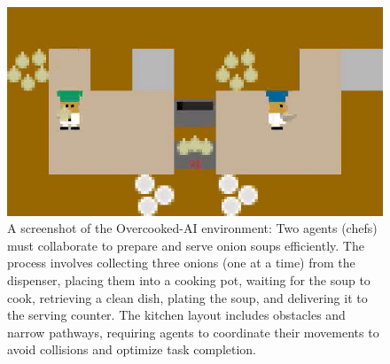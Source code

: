 \documentclass[pdflatex,sn-mathphys-num]{sn-jnl}%
\theoremstyle{thmstyleone}%
\theoremstyle{thmstyletwo}%
\theoremstyle{thmstylethree}%
\begin{document}
\begin{figure}[h!]
    \centering
    \includegraphics[trim=0cm -0.5cm 0cm -0.5cm, clip, width=0.6\linewidth]{figures/overcooked.png}
    \caption{A screenshot of the Overcooked-AI environment: Two agents (chefs) must collaborate to prepare and serve onion soups efficiently. The process involves collecting three onions (one at a time) from the dispenser, placing them into a cooking pot, waiting for the soup to cook, retrieving a clean dish, plating the soup, and delivering it to the serving counter. The kitchen layout includes obstacles and narrow pathways, requiring agents to coordinate their movements to avoid collisions and optimize task completion.}
    \label{fig:overcooked}
\end{figure}
\end{document}
